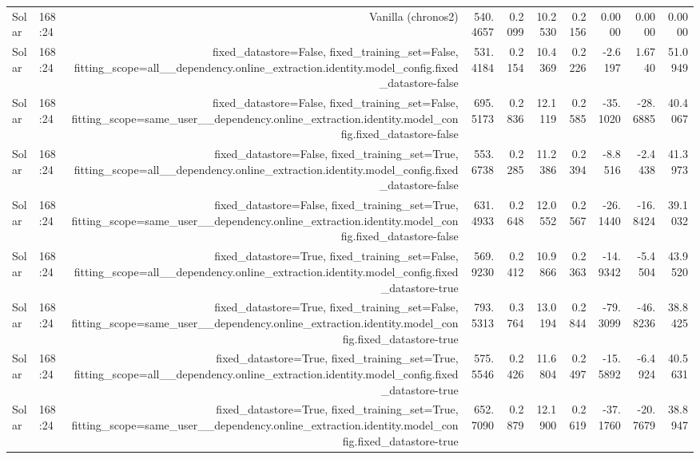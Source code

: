 \begin{tabular}{llrrrrrrrr}
Solar & 168:24 & Vanilla (chronos2) & 540.4657 & 0.2099 & 10.2530 & 0.2156 & 0.0000 & 0.0000 & 0.0000 \\
Solar & 168:24 & fixed\_datastore=False, fixed\_training\_set=False, fitting\_scope=all\_\_dependency.online\_extraction.identity.model\_config.fixed\_datastore-false & 531.4184 & 0.2154 & 10.4369 & 0.2226 & -2.6197 & 1.6740 & 51.0949 \\
Solar & 168:24 & fixed\_datastore=False, fixed\_training\_set=False, fitting\_scope=same\_user\_\_dependency.online\_extraction.identity.model\_config.fixed\_datastore-false & 695.5173 & 0.2836 & 12.1119 & 0.2585 & -35.1020 & -28.6885 & 40.4067 \\
Solar & 168:24 & fixed\_datastore=False, fixed\_training\_set=True, fitting\_scope=all\_\_dependency.online\_extraction.identity.model\_config.fixed\_datastore-false & 553.6738 & 0.2285 & 11.2386 & 0.2394 & -8.8516 & -2.4438 & 41.3973 \\
Solar & 168:24 & fixed\_datastore=False, fixed\_training\_set=True, fitting\_scope=same\_user\_\_dependency.online\_extraction.identity.model\_config.fixed\_datastore-false & 631.4933 & 0.2648 & 12.0552 & 0.2567 & -26.1440 & -16.8424 & 39.1032 \\
Solar & 168:24 & fixed\_datastore=True, fixed\_training\_set=False, fitting\_scope=all\_\_dependency.online\_extraction.identity.model\_config.fixed\_datastore-true & 569.9230 & 0.2412 & 10.9866 & 0.2363 & -14.9342 & -5.4504 & 43.9520 \\
Solar & 168:24 & fixed\_datastore=True, fixed\_training\_set=False, fitting\_scope=same\_user\_\_dependency.online\_extraction.identity.model\_config.fixed\_datastore-true & 793.5313 & 0.3764 & 13.0194 & 0.2844 & -79.3099 & -46.8236 & 38.8425 \\
Solar & 168:24 & fixed\_datastore=True, fixed\_training\_set=True, fitting\_scope=all\_\_dependency.online\_extraction.identity.model\_config.fixed\_datastore-true & 575.5546 & 0.2426 & 11.6804 & 0.2497 & -15.5892 & -6.4924 & 40.5631 \\
Solar & 168:24 & fixed\_datastore=True, fixed\_training\_set=True, fitting\_scope=same\_user\_\_dependency.online\_extraction.identity.model\_config.fixed\_datastore-true & 652.7090 & 0.2879 & 12.1900 & 0.2619 & -37.1760 & -20.7679 & 38.8947 \\
\bottomrule
\end{tabular}
